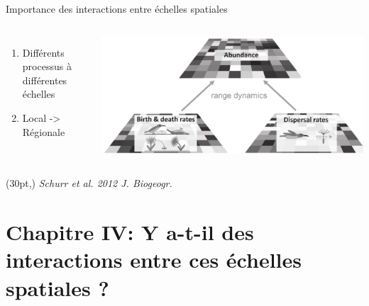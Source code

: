 \documentclass[11pt, compress, aspectratio=1610]{beamer}
\newcommand\smallcitation[1]{%
\begin{textblock*}{\textwidth}(30pt,\textheight)
	\raggedleft \footnotesize\textit{#1}
\end{textblock*}}
\providecommand{\tightlist}{%
  \setlength{\itemsep}{0pt}\setlength{\parskip}{0pt}}
\newcommand{\begincols}{\begin{columns}}
\newcommand{\stopcols}{\end{columns}}
\begin{document}
\begin{frame}{Importance des interactions entre échelles spatiales}

\begincols
{}

\begin{enumerate}
    \def\labelenumi{\arabic{enumi}.}
    \tightlist
    \item
      Différents processus à différentes échelles
    \item
      Local -> Régionale
  \end{enumerate}

\hfill{} \centering
 \includegraphics[scale=0.35]{figures/scaleInteg.pdf}\par
\stopcols
\smallcitation{Schurr et al. 2012 J. Biogeogr.}

\end{frame}

\section{Chapitre IV: Y a-t-il des interactions entre ces échelles
spatiales
?}\label{chapitre-iv-y-a-t-il-des-interactions-entre-ces-uxe9chelles-spatiales}
\end{document}
